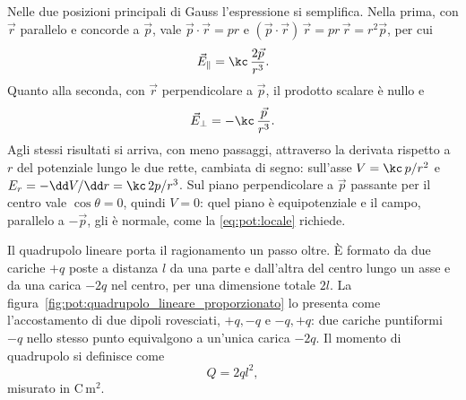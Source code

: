 \documentclass[main.tex]{subfiles}
\begin{document}
	Nelle due posizioni principali di Gauss l'espressione si semplifica. Nella prima, con $\vec r$ parallelo e concorde a $\vec p$, vale $\vec p\cdot\vec r=pr$ e $(\vec p\cdot\vec r)\,\vec r=pr\,\vec r=r^2\vec p$, per cui
	\[
	\vec E_{\parallel}=\kc\,\frac{2\vec p}{r^3}.
	\]
	Quanto alla seconda, con $\vec r$ perpendicolare a $\vec p$, il prodotto scalare è nullo e
	\[
	\vec E_{\perp}=-\kc\,\frac{\vec p}{r^3}.
	\]
	Agli stessi risultati si arriva, con meno passaggi, attraverso la derivata rispetto a $r$ del potenziale lungo le due rette, cambiata di segno: sull'asse $V=\kc\,p/r^2$ e $E_r=-\dd V/\dd r=\kc\,2p/r^3$. Sul piano perpendicolare a $\vec p$ passante per il centro vale $\cos\theta=0$, quindi $V=0$: quel piano è equipotenziale e il campo, parallelo a $-\vec p$, gli è normale, come la \eqref{eq:pot:locale} richiede.
	
	Il quadrupolo lineare porta il ragionamento un passo oltre. È formato da due cariche $+q$ poste a distanza $l$ da una parte e dall'altra del centro lungo un asse e da una carica $-2q$ nel centro, per una dimensione totale $2l$. La figura~\ref{fig:pot:quadrupolo_lineare_proporzionato} lo presenta come l'accostamento di due dipoli rovesciati, $+q,-q$ e $-q,+q$: due cariche puntiformi $-q$ nello stesso punto equivalgono a un'unica carica $-2q$. Il momento di quadrupolo si definisce come
	\[
	Q=2ql^2,
	\]
	misurato in $\mathrm{C\,m^2}$.
	
\end{document}
